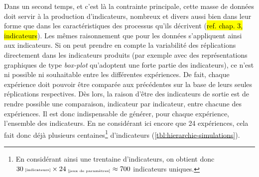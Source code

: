 	Dans un second temps, et c'est là la contrainte principale, cette masse de données doit servir à la production d'indicateurs, nombreux et divers aussi bien dans leur forme que dans les caractéristiques des processus qu'ils décrivent (\hl{ref. chap. 3, indicateurs}).
	Les mêmes raisonnement que pour les données s'appliquent ainsi aux indicateurs.
	Si on peut prendre en compte la variabilité des réplications directement dans les indicateurs produits (par exemple avec des représentations graphiques de type \textit{box-plot} qu'adoptent une forte partie des indicateurs), ce n'est ni possible ni souhaitable entre les différentes expériences.
	De fait, chaque expérience doit pouvoir être comparée aux précédentes sur la base de leurs seules réplications respectives.
	Dès lors, la raison d'être des indicateurs de sortie est de rendre possible une comparaison, indicateur par indicateur, entre chacune des expériences.
	Il est donc indispensable de générer, pour chaque expérience, l'ensemble des indicateurs. En ne considérant ici encore que 24 expériences, cela fait donc déjà plusieurs centaines\footnote{
	En considérant ainsi une trentaine d'indicateurs, on obtient donc $30{\text{\tiny ~[indicateurs]}} \times 24_{\text{\tiny ~[jeux de paramètres]}} \approx 700$ indicateurs uniques.
	} d'indicateurs (\cref{tbl:hierarchie-simulations}).

